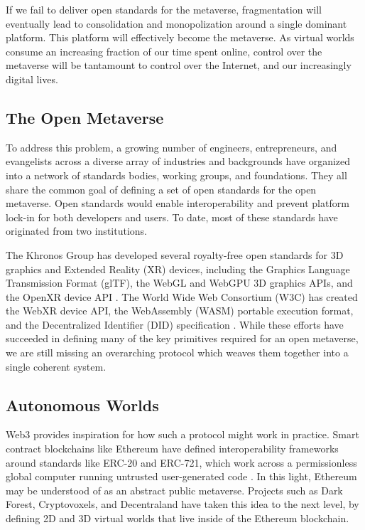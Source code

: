 \documentclass[twocolumn, 10pt]{article}
\begin{document}
If we fail to deliver open standards for the metaverse, fragmentation will eventually lead to consolidation and monopolization around a single dominant platform. This platform will effectively become the metaverse. As virtual worlds consume an increasing fraction of our time spent online, control over the metaverse will be tantamount to control over the Internet, and our increasingly digital lives.

\subsection{The Open Metaverse}
To address this problem, a growing number of engineers, entrepreneurs, and evangelists across a diverse array of industries and backgrounds have organized into a network of standards bodies, working groups, and foundations. They all share the common goal of defining a set of open standards for the open metaverse. Open standards would enable interoperability and prevent platform lock-in for both developers and users. To date, most of these standards have originated from two institutions.

The Khronos Group has developed several royalty-free open standards for 3D graphics and Extended Reality (XR) devices, including the Graphics Language Transmission Format (glTF), the WebGL and WebGPU 3D graphics APIs, and the OpenXR device API \cite{khronos}. The World Wide Web Consortium (W3C) has created the WebXR device API, the WebAssembly (WASM) portable execution format, and the Decentralized Identifier (DID) specification \cite{W3C}. While these efforts have succeeded in defining many of the key primitives required for an open metaverse, we are still missing an overarching protocol which weaves them together into a single coherent system.

\subsection{Autonomous Worlds}
Web3 provides inspiration for how such a protocol might work in practice. Smart contract blockchains like Ethereum have defined interoperability frameworks around standards like ERC-20 and ERC-721, which work across a permissionless global computer running untrusted user-generated code \cite{Buterin2013}. In this light, Ethereum may be understood of as an abstract public metaverse. Projects such as Dark Forest, Cryptovoxels, and Decentraland have taken this idea to the next level, by defining 2D and 3D virtual worlds that live inside of the Ethereum blockchain.
\end{document}
